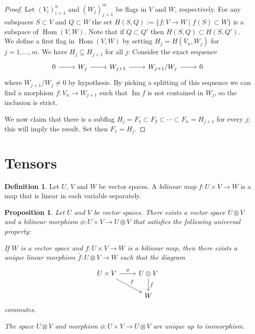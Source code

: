 \documentclass[11pt]{article}
\newtheorem{prop}[theo]{Proposition}
\theoremstyle{definition}
\newtheorem{defi}[theo]{Definition}
\DeclareMathOperator{\Hom}{Hom}
\DeclareMathOperator{\Img}{Im}
\begin{document}
\begin{proof}
Let $(V_i)_{i=1}^n$ and $(W_j)_{j=1}^m$ be flags in $V$ and $W$, respectively.
For any subspaces $S \subset V$ and $Q \subset W$ the set $H(S,Q) := \{ f : V \to W \mid f(S) \subset W \}$ is a subspace of $\Hom(V,W)$.
Note that if $Q \subset Q'$ then $H(S,Q) \subset H(S,Q')$.
We define a first flag in $\Hom(V,W)$ by setting $H_j = H(V_n, W_j)$ for $j=1,\ldots,m$.
We have $H_j \subsetneq H_{j+1}$ for all $j$:
Consider the exact sequence
\[
\begin{tikzcd}
0 \ar[r] &
W_j \ar[r] &
W_{j+1} \ar[r] &
W_{j+1} / W_j \ar[r] &
0
\end{tikzcd}
\]
where $W_{j+1} / W_j \not= 0$ by hypothesis.
By picking a splitting of this sequence we can find a morphism $f : V_n \to W_{j+1}$ such that $\Img f$ is not contained in $W_j$, so the inclusion is strict.

We now claim that there is a subflag $H_j = F_1 \subset F_2 \subset \cdots \subset F_n = H_{j+1}$ for every $j$; this will imply the result.
Set then $F_1 = H_j$.
\end{proof}



\section{Tensors}


\begin{defi}
Let $U$, $V$ and $W$ be vector spaces.
A \emph{bilinear map} $f : U \times V \to W$ is a map that is linear in each variable separately.
\end{defi}


\begin{prop}
Let $U$ and $V$ be vector spaces.
There exists a vector space $U \otimes V$ and a bilinear morphism $\phi : U \times V \to U \otimes V$ that satisfies the following universal property:

If $W$ is a vector space and $f : U \times V \to W$ is a bilinear map, then there exists a unique linear morphism $\hat f : U \otimes V \to W$ such that the diagram
\[
\begin{tikzcd}
U \times V \ar[r,"\phi"] \ar[dr,"f"] & U \otimes V \ar[d,"\hat f"]
\\
& W
\end{tikzcd}
\]
commutes.

The space $U \otimes V$ and morphism $\phi : U \times V \to U \otimes V$ are unique up to isomorphism.
\end{prop}
\end{document}
